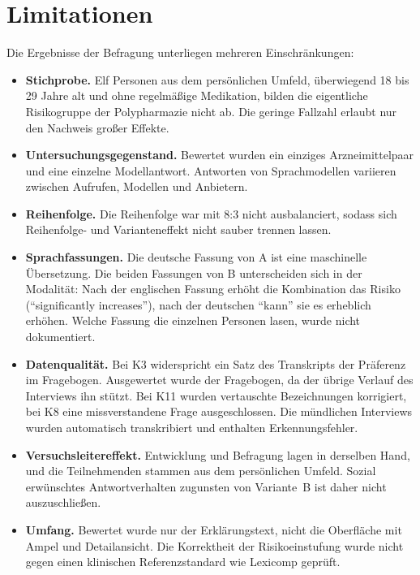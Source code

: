 \section{Limitationen}

Die Ergebnisse der Befragung unterliegen mehreren Einschränkungen:

\begin{itemize}
  \item \textbf{Stichprobe.} Elf Personen aus dem persönlichen Umfeld, überwiegend 18 bis 29 Jahre alt und ohne regelmäßige Medikation, bilden die eigentliche Risikogruppe der Polypharmazie nicht ab. Die geringe Fallzahl erlaubt nur den Nachweis großer Effekte.
  \item \textbf{Untersuchungsgegenstand.} Bewertet wurden ein einziges Arzneimittelpaar und eine einzelne Modellantwort. Antworten von Sprachmodellen variieren zwischen Aufrufen, Modellen und Anbietern.
  \item \textbf{Reihenfolge.} Die Reihenfolge war mit 8:3 nicht ausbalanciert, sodass sich Reihenfolge- und Varianteneffekt nicht sauber trennen lassen.
  \item \textbf{Sprachfassungen.} Die deutsche Fassung von A ist eine maschinelle Übersetzung. Die beiden Fassungen von B unterscheiden sich in der Modalität: Nach der englischen Fassung erhöht die Kombination das Risiko (\enquote{significantly increases}), nach der deutschen \enquote{kann} sie es erheblich erhöhen. Welche Fassung die einzelnen Personen lasen, wurde nicht dokumentiert.
  \item \textbf{Datenqualität.} Bei K3 widerspricht ein Satz des Transkripts der Präferenz im Fragebogen. Ausgewertet wurde der Fragebogen, da der übrige Verlauf des Interviews ihn stützt. Bei K11 wurden vertauschte Bezeichnungen korrigiert, bei K8 eine missverstandene Frage ausgeschlossen. Die mündlichen Interviews wurden automatisch transkribiert und enthalten Erkennungsfehler.
  \item \textbf{Versuchsleitereffekt.} Entwicklung und Befragung lagen in derselben Hand, und die Teilnehmenden stammen aus dem persönlichen Umfeld. Sozial erwünschtes Antwortverhalten zugunsten von Variante~B ist daher nicht auszuschließen.
  \item \textbf{Umfang.} Bewertet wurde nur der Erklärungstext, nicht die Oberfläche mit Ampel und Detailansicht. Die Korrektheit der Risikoeinstufung wurde nicht gegen einen klinischen Referenzstandard wie Lexicomp geprüft.
\end{itemize}
